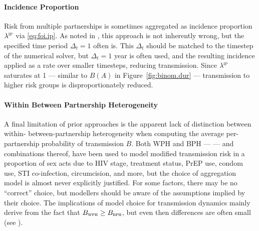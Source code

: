 \paragraph{Incidence Proportion}
Risk from multiple partnerships is sometimes aggregated as
incidence proportion $\lambda^\textsc{ip}$ via \eqref{eq:foi.ip}.
As noted in , this approach is not inherently wrong,
but the specified time period $\Delta_t = 1$ often is.
This $\Delta_t$ should be matched to the timestep of the numerical solver,
but $\Delta_t = 1$ year is often used,
and the resulting incidence applied as a rate over smaller timesteps, reducing transmission.
Since $\lambda^\textsc{ip}$ saturates at 1 --- similar to $B(A)$ in Figure~\ref{fig:binom.dur} ---
transmission to higher risk groups is disproportionately reduced.
\paragraph{Within \vs Between Partnership Heterogeneity}
A final limitation of prior approaches is the apparent lack of distinction between
within- \vs between-partnership heterogeneity when computing
the average per-partnership probability of transmission $B$.
Both WPH and BPH --- \ie {} --- and combinations thereof, have been used
to model modified transmission risk in a proportion of sex acts due to
HIV stage, treatment status, PrEP use, condom use, STI co-infection, circumcision, and more,
but the choice of aggregation model is almost never explicitly justified.
For some factors, there may be no ``correct'' choice,
but modellers should be aware of the assumptions implied by their choice.
The implications of model choice for transmission dynamics
mainly derive from the fact that $B_{\textsc{wph}} \ge B_{\textsc{bph}}$,
but even then differences are often small (see ).
